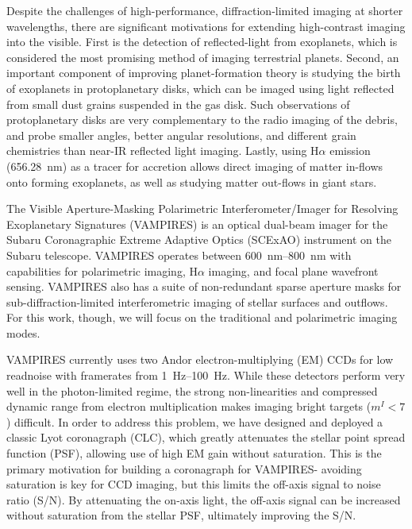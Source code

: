 \documentclass[]{spie}  %
\begin{document}
Despite the challenges of high-performance, diffraction-limited imaging at shorter wavelengths, there are significant motivations for extending high-contrast imaging into the visible. First is the detection of reflected-light from exoplanets, which is considered the most promising method of imaging terrestrial planets\cite{traub2010}. Second, an important component of improving planet-formation theory is studying the birth of exoplanets in protoplanetary disks, which can be imaged using light reflected from small dust grains suspended in the gas disk. Such observations of protoplanetary disks are very complementary to the radio imaging of the debris, and probe smaller angles, better angular resolutions, and different grain chemistries than near-IR reflected light imaging. Lastly, using H$\alpha$ emission (\qty{656.28}{\nano\meter}) as a tracer for accretion allows direct imaging of matter in-flows onto forming exoplanets\cite{currie2022}, as well as studying matter out-flows in giant stars\cite{norris2020}.

The Visible Aperture-Masking Polarimetric Interferometer/Imager for Resolving Exoplanetary Signatures (VAMPIRES)\cite{norris2015} is an optical dual-beam imager for the Subaru Coronagraphic Extreme Adaptive Optics (SCExAO) instrument on the Subaru telescope. VAMPIRES operates between \qtyrange{600}{800}{\nano\meter} with capabilities for polarimetric imaging\cite{norris2020}, H$\alpha$ imaging\cite{uyama2020}, and focal plane wavefront sensing\cite{vievard2020}. VAMPIRES also has a suite of non-redundant sparse aperture masks for sub-diffraction-limited interferometric imaging of stellar surfaces and outflows. For this work, though, we will focus on the traditional and polarimetric imaging modes.

VAMPIRES currently uses two Andor electron-multiplying (EM) CCDs for low readnoise with framerates from \qtyrange{1}{100}{\hertz}. While these detectors perform very well in the photon-limited regime, the strong non-linearities and compressed dynamic range from electron multiplication makes imaging bright targets ($m^I < 7$) difficult. In order to address this problem, we have designed and deployed a classic Lyot coronagraph (CLC), which greatly attenuates the stellar point spread function (PSF), allowing use of high EM gain without saturation. This is the primary motivation for building a coronagraph for VAMPIRES- avoiding saturation is key for CCD imaging, but this limits the off-axis signal to noise ratio (S/N). By attenuating the on-axis light, the off-axis signal can be increased without saturation from the stellar PSF, ultimately improving the S/N.
\end{document}
